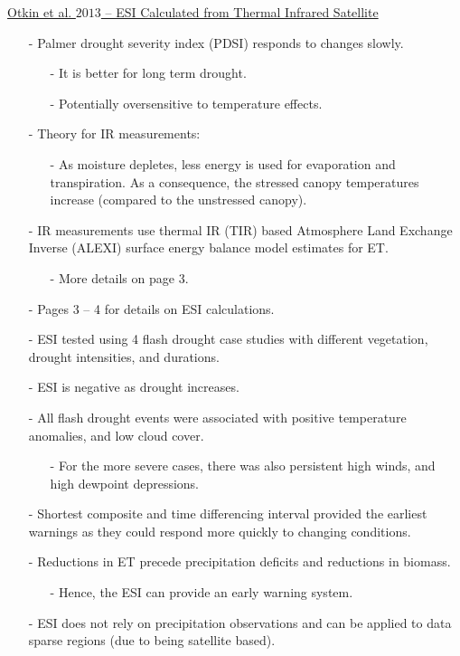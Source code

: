 \documentclass[12pt, letterpaper]{article}
\begin{document}
	\underline{Otkin et al. $2013$ -- ESI Calculated from Thermal Infrared Satellite}
	\begin{itemize}
		\item[-] Palmer drought severity index (PDSI) responds to changes slowly.
		\begin{itemize}
			\item[-] It is better for long term drought.
			\item[-] Potentially oversensitive to temperature effects.
		\end{itemize}
	    \item[-] Theory for IR measurements:
	    \begin{itemize}
	    	\item[-] As moisture depletes, less energy is used for evaporation and transpiration.
	    	         As a consequence, the stressed canopy temperatures increase (compared to the
	    	         unstressed canopy).
	    \end{itemize}
        \item[-] IR measurements use thermal IR (TIR) based Atmosphere Land Exchange Inverse (ALEXI)
                 surface energy balance model estimates for ET.
        \begin{itemize}
        	\item[-] More details on page 3.
        \end{itemize}
        \item[-] Pages 3 -- 4 for details on ESI calculations.
        \item[-] ESI tested using 4 flash drought case studies with different vegetation, drought
                 intensities, and durations.
        \item[-] ESI is negative as drought increases.
        \item[-] All flash drought events were associated with positive temperature anomalies, and
                 low cloud cover.
        \begin{itemize}
        	\item[-] For the more severe cases, there was also persistent high winds, and high dewpoint
        	         depressions.
        \end{itemize}
        \item[-] Shortest composite and time differencing interval provided the earliest warnings as
                 they could respond more quickly to changing conditions.
        \item[-] Reductions in ET precede precipitation deficits and reductions in biomass.
        \begin{itemize}
        	\item[-] Hence, the ESI can provide an early warning system.
        \end{itemize}
        \item[-] ESI does not rely on precipitation observations and can be applied to data sparse
                 regions (due to being satellite based).
	\end{itemize}
    
\end{document}
